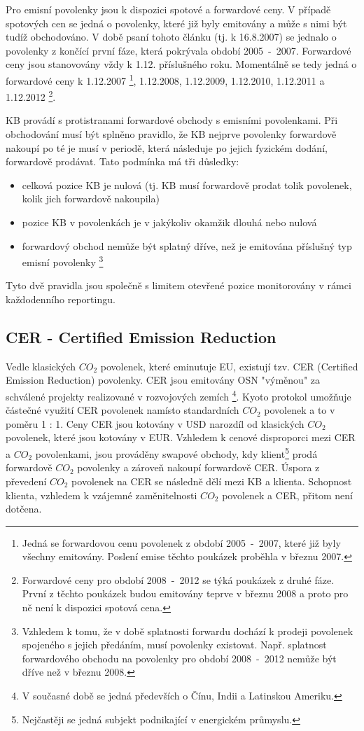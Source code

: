 \documentclass[a4paper]{book}
\begin{document}
Pro emisní povolenky jsou k dispozici spotové a forwardové ceny. V případě spotových cen se jedná o povolenky, které již byly emitovány a může s nimi být tudíž obchodováno. V době psaní tohoto článku (tj. k 16.8.2007) se jednalo o povolenky z končící první fáze, která pokrývala období 2005~-~2007. Forwardové ceny jsou stanovovány vždy k 1.12. příslušného roku. Momentálně se tedy jedná o forwardové ceny k 1.12.2007 \footnote{Jedná se forwardovou cenu povolenek z období 2005~-~2007, které již byly všechny emitovány. Poslení emise těchto poukázek proběhla v březnu 2007.}, 1.12.2008, 1.12.2009, 1.12.2010, 1.12.2011 a 1.12.2012 \footnote{Forwardové ceny pro období 2008~-~2012 se týká poukázek z druhé fáze. První z těchto poukázek budou emitovány teprve v březnu 2008 a proto pro ně není k dispozici spotová cena.}.

KB provádí s protistranami forwardové obchody s emisními povolenkami. Při obchodování musí být splněno pravidlo, že KB nejprve povolenky forwardově nakoupí po té je musí v periodě, která následuje po jejich fyzickém dodání, forwardově prodávat. Tato podmínka má tři důsledky:
\begin{itemize}
\item celková pozice KB je nulová (tj. KB musí forwardově prodat tolik povolenek, kolik jich forwardově nakoupila)
\item pozice KB v povolenkách je v jakýkoliv okamžik dlouhá nebo nulová
\item forwardový obchod nemůže být splatný dříve, než je emitována příslušný typ emisní povolenky \footnote{Vzhledem k tomu, že v době splatnosti forwardu dochází k prodeji povolenek spojeného s jejich předáním, musí povolenky existovat. Např. splatnost forwardového obchodu na povolenky pro období 2008~-~2012 nemůže být dříve než v březnu 2008.} 
\end{itemize}
Tyto dvě pravidla jsou společně s limitem otevřené pozice monitorovány v rámci každodenního reportingu.

\subsection{CER - Certified Emission Reduction}

Vedle klasických $CO_2$ povolenek, které eminutuje EU, existují tzv. CER (Certified Emission Reduction) povolenky. CER jsou emitovány OSN "výměnou" za schválené projekty realizované v rozvojových zemích \footnote{V současné době se jedná předevších o Čínu, Indii a Latinskou Ameriku.}. Kyoto protokol umožňuje částečné využití CER povolenek namísto standardních $CO_2$ povolenek a to v poměru 1 : 1. Ceny CER jsou kotovány v USD narozdíl od klasických $CO_2$ povolenek, které jsou kotovány v EUR. Vzhledem k cenové disproporci mezi CER a $CO_2$ povolenkami, jsou prováděny swapové obchody, kdy klient\footnote{Nejčastěji se jedná subjekt podnikající v energickém průmyslu.} prodá forwardově $CO_2$ povolenky a zároveň nakoupí forwardově CER. Úspora z převedení $CO_2$ povolenek na CER se následně dělí mezi KB a klienta. Schopnost klienta, vzhledem k vzájemné zaměnitelnosti $CO_2$ povolenek a CER, přitom není dotčena.
\end{document}
